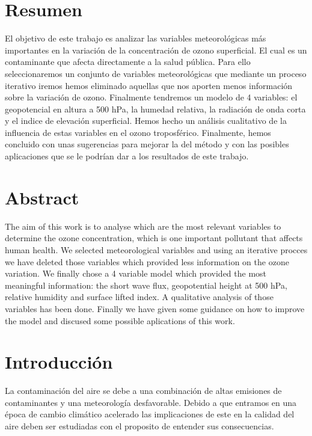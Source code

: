 \documentclass[12pt]{article}
\begin{document}
\newpage
\begin{center}



\section{Resumen}
El objetivo de este trabajo  es analizar las variables meteorológicas más importantes en la variación de la concentración de ozono superficial. El cual es un contaminante que afecta directamente a la salud pública. Para ello seleccionaremos un  conjunto de variables meteorológicas que  mediante un proceso iterativo iremos hemos eliminado aquellas que nos aporten menos información sobre la variación de ozono. Finalmente tendremos un modelo de  4 variables: el geopotencial en altura a 500 hPa, la humedad relativa, la radiación de onda corta y el indice de elevación superficial. Hemos hecho un análisis cualitativo de la influencia de estas variables en el ozono troposférico. Finalmente, hemos concluido con unas sugerencias para mejorar la del método  y con las posibles aplicaciones que se le podrían dar a los resultados de este trabajo.
\section*{Abstract}
The aim of this  work is  to analyse which are the most relevant variables to determine the ozone concentration, which is one important pollutant that affects human health. We selected meteorological variables and  using an iterative procces we have deleted those variables which provided less information on the ozone variation. We finally chose a 4 variable model which provided the most meaningful information: the short wave flux, geopotential height at 500 hPa, relative humidity and surface lifted index. A qualitative analysis of those variables has been done. Finally  we have given some guidance on how to improve the model and discused some  possible aplications of this work.

\end{center}
\newpage
\section{Introducción} \label{sec:introduccion}


La contaminación del aire se debe a una combinación de altas emisiones de contaminantes y una meteorología desfavorable. 
Debido a que entramos en una época de cambio climático acelerado las implicaciones de este en  la calidad del aire deben ser estudiadas con el proposito de entender sus consecuencias.
\end{document}
